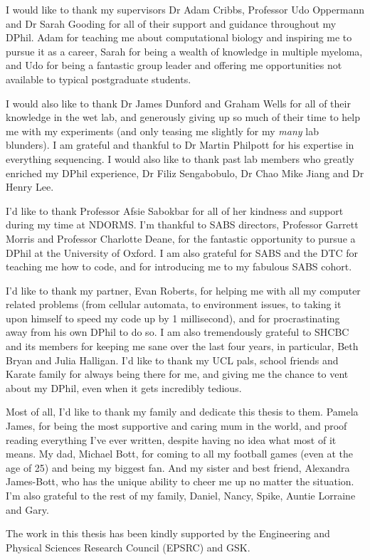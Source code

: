 I would like to thank my supervisors Dr Adam Cribbs, Professor Udo Oppermann and Dr Sarah Gooding for all of their support and guidance throughout my DPhil.
Adam for teaching me about computational biology and inspiring me to pursue it as a career, Sarah for being a wealth of knowledge in multiple myeloma, and Udo for being a fantastic group leader and offering me opportunities not available to typical postgraduate students.  

I would also like to thank Dr James Dunford and Graham Wells for all of their knowledge in the wet lab, and generously giving up so much of their time to help me with my experiments (and only teasing me slightly for my \textit{many} lab blunders).
I am grateful and thankful to Dr Martin Philpott for his expertise in everything sequencing.
I would also like to thank past lab members who greatly enriched my DPhil experience, Dr Filiz Sengabobulo, Dr Chao Mike Jiang and Dr Henry Lee.

I'd like to thank Professor Afsie Sabokbar for all of her kindness and support during my time at NDORMS. 
I'm thankful to SABS directors, Professor Garrett Morris and Professor Charlotte Deane, for the fantastic opportunity to pursue a DPhil at the University of Oxford. 
I am also grateful for SABS and the DTC for teaching me how to code, and for introducing me to my fabulous SABS cohort. 

I'd like to thank my partner, Evan Roberts, for helping me with all my computer related problems (from cellular automata, to environment issues, to taking it upon himself to speed my code up by 1 millisecond), and for procrastinating away from his own DPhil to do so. 
I am also tremendously grateful to SHCBC and its members for keeping me sane over the last four years, in particular, Beth Bryan and Julia Halligan.
I'd like to thank my UCL pals, school friends and Karate family for always being there for me, and giving me the chance to vent about my DPhil, even when it gets incredibly tedious. 

Most of all, I'd like to thank my family and dedicate this thesis to them.
Pamela James, for being the most supportive and caring mum in the world, and proof reading everything I've ever written, despite having no idea what most of it means.
My dad, Michael Bott, for coming to all my football games (even at the age of 25) and being my biggest fan.
And my sister and best friend, Alexandra James-Bott, who has the unique ability to cheer me up no matter the situation.
I'm also grateful to the rest of my family, Daniel, Nancy, Spike, Auntie Lorraine and Gary.

The work in this thesis has been kindly supported by the Engineering and Physical Sciences Research Council (EPSRC) and GSK.
